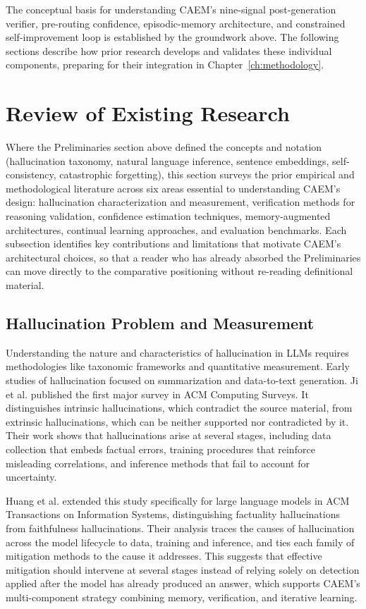 The conceptual basis for understanding CAEM's nine-signal post-generation verifier, pre-routing confidence, episodic-memory architecture, and constrained self-improvement loop is established by the groundwork above. The following sections describe how prior research develops and validates these individual components, preparing for their integration in Chapter~\ref{ch:methodology}.

\section{Review of Existing Research}

Where the Preliminaries section above defined the concepts and notation (hallucination taxonomy, natural language inference, sentence embeddings, self-consistency, catastrophic forgetting), this section surveys the prior empirical and methodological literature across six areas essential to understanding CAEM's design: hallucination characterization and measurement, verification methods for reasoning validation, confidence estimation techniques, memory-augmented architectures, continual learning approaches, and evaluation benchmarks. Each subsection identifies key contributions and limitations that motivate CAEM's architectural choices, so that a reader who has already absorbed the Preliminaries can move directly to the comparative positioning without re-reading definitional material.

\subsection{Hallucination Problem and Measurement}

Understanding the nature and characteristics of hallucination in LLMs requires methodologies like taxonomic frameworks and quantitative measurement. Early studies of hallucination focused on summarization and data-to-text generation. Ji et al. \cite{ji2023survey} published the first major survey in ACM Computing Surveys. It distinguishes intrinsic hallucinations, which contradict the source material, from extrinsic hallucinations, which can be neither supported nor contradicted by it. Their work shows that hallucinations arise at several stages, including data collection that embeds factual errors, training procedures that reinforce misleading correlations, and inference methods that fail to account for uncertainty.

Huang et al. \cite{huang2025survey} extended this study specifically for large language models in ACM Transactions on Information Systems, distinguishing factuality hallucinations from faithfulness hallucinations. Their analysis traces the causes of hallucination across the model lifecycle to data, training and inference, and ties each family of mitigation methods to the cause it addresses. This suggests that effective mitigation should intervene at several stages instead of relying solely on detection applied after the model has already produced an answer, which supports CAEM's multi-component strategy combining memory, verification, and iterative learning.

